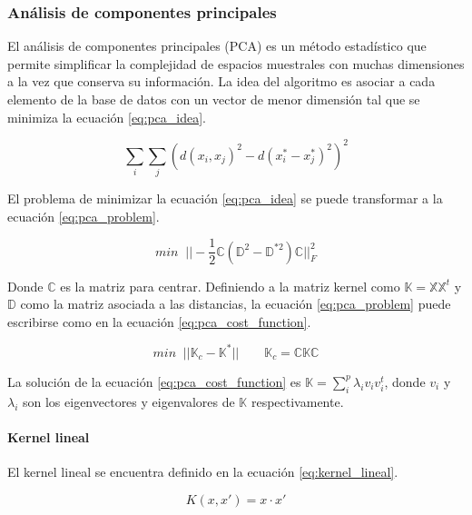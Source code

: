 \subsubsection{Análisis de componentes principales \label{sec:pca}}

El análisis de componentes principales (PCA) es un método estadístico que permite simplificar la complejidad de espacios muestrales con muchas dimensiones a la vez que conserva su información. La idea del algoritmo es asociar a cada elemento de la base de datos con un vector de menor dimensión tal que se minimiza la ecuación \ref{eq:pca_idea}.

\begin{equation}
    \sum_i \sum_j (d(x_i,x_j)^2-d(x^*_i-x_j^*)^2)^2
    \label{eq:pca_idea}
\end{equation}

El problema de minimizar la ecuación \ref*{eq:pca_idea} se puede transformar a la ecuación \ref{eq:pca_problem}.

\begin{equation}
    min\;\; ||-\frac{1}{2}\mathbb{C}(\mathbb{D}^2-\mathbb{D}^{*2})\mathbb{C}||_F^2
    \label{eq:pca_problem}
\end{equation}

Donde $\mathbb{C}$ es la matriz para centrar. Definiendo a la matriz kernel como $\mathbb{K}=\mathbb{X}\mathbb{X}^t$ y $\mathbb{D}$ como la matriz asociada a las distancias, la ecuación \ref{eq:pca_problem} puede escribirse como en la ecuación \ref{eq:pca_cost_function}.

\begin{equation}
    min\;\; ||\mathbb{K}_c-\mathbb{K}^*|| \qquad \mathbb{K}_c = \mathbb{C}\mathbb{K}\mathbb{C}
    \label{eq:pca_cost_function}
\end{equation}

La solución de la ecuación \ref{eq:pca_cost_function} es $\mathbb{K}=\sum\limits_i^p \lambda_i v_i v_i^t $, donde $v_i$ y $\lambda_i$ son los eigenvectores y eigenvalores de $\mathbb{K}$ respectivamente.

\paragraph{Kernel lineal}

El kernel lineal se encuentra definido en la ecuación \ref{eq:kernel_lineal}.

\begin{equation}
    K(x,x') = x \cdot x'
    \label{eq:kernel_lineal}
\end{equation}

